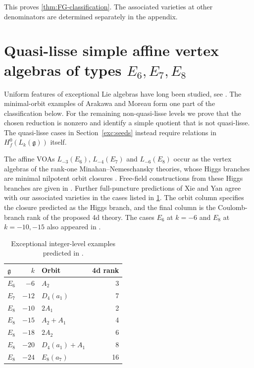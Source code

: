 \documentclass[11pt,a4paper]{amsart}
\numberwithin{equation}{section}
\theoremstyle{definition}
\theoremstyle{remark}
\newcommand{\g}{\mathfrak g}
\begin{document}
This proves \cref{thm:FG-classification}. The associated varieties at
other denominators are determined separately in the appendix.

\section{\texorpdfstring{Quasi-lisse simple affine vertex algebras of types $E_6,E_7,E_8$}{Quasi-lisse simple affine vertex algebras of types E6,E7,E8}}
\label{sec:exceptional-e}

Uniform features of exceptional Lie algebras have long been studied, see \cite{Cvitanovic1981,Deligne1996}.
The minimal-orbit examples of Arakawa and Moreau
\cite[Theorem~1.1(2)]{ArakawaMoreau2018} form one part of the classification below.
For the remaining non-quasi-lisse levels we prove that the chosen
reduction is nonzero and identify a simple quotient that is not
quasi-lisse. The quasi-lisse cases in Section~\ref{exc:seeds} instead
require relations in $H_f^0(L_k(\g))$ itself.

The affine VOAs $L_{-3}(E_6)$, $L_{-4}(E_7)$ and $L_{-6}(E_8)$ occur as the vertex algebras of the rank-one Minahan--Nemeschansky theories, whose Higgs branches are minimal nilpotent orbit closures
\cite[Section~4]{BeemRastelli2018}. Free-field constructions from
these Higgs branches are given in
\cite[Section~3]{BeemMeneghelliRastelli2019}.
Further full-puncture predictions of Xie and Yan
\cite[Tables~20 and~22]{XieYanLisse2021} agree with our associated
varieties in the cases listed in \cref{tab:physics-E}. The orbit column
specifies the closure predicted as the Higgs branch, and the final column
is the Coulomb-branch rank of the proposed 4d theory. The cases $E_6$ at $k=-6$ and $E_8$ at $k=-10,-15$ also appeared in \cite[Tables~5, 7 and~17]{LiXieYan2023}.

\begin{table}[htbp]\centering\small
\begin{tabular}{@{}lrlr@{}}\toprule
$\g$&$k$&Orbit&4d rank\\\midrule
$E_6$&$-6$&$A_2$&3\\
$E_7$&$-12$&$D_4(a_1)$&7\\
$E_8$&$-10$&$2A_1$&2\\
$E_8$&$-15$&$A_2+A_1$&4\\
$E_8$&$-18$&$2A_2$&6\\
$E_8$&$-20$&$D_4(a_1)+A_1$&8\\
$E_8$&$-24$&$E_8(a_7)$&16\\\bottomrule
\end{tabular}
\par\smallskip
\caption{Exceptional integer-level examples predicted in \cite{XieYanLisse2021}.}
\label{tab:physics-E}
\end{table}
\end{document}
